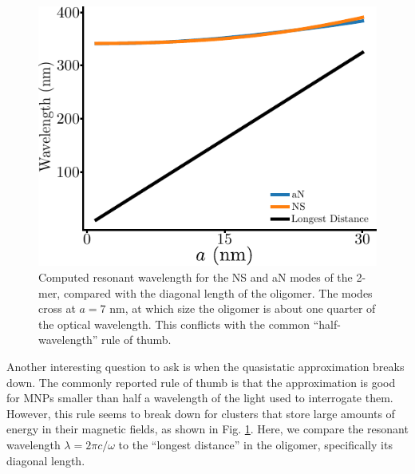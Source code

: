 \documentclass [11pt, proquest] {uwthesis}[2016/11/22]
\begin{document}
\begin{figure}
\begin{centering}
\includegraphics{length_comparison_scale.pdf}
\caption{Computed resonant wavelength for the NS and aN modes of the 2-mer, compared with the diagonal length of the oligomer. The modes cross at $a = 7$ nm, at which size the oligomer is about one quarter of the optical wavelength. This conflicts with the common ``half-wavelength'' rule of thumb.}
\label{scale_wavelength_comp}
\end{centering}
\end{figure}


Another interesting question to ask is when the quasistatic approximation breaks down. The commonly reported rule of thumb is that the approximation is good for MNPs smaller than half a wavelength of the light used to interrogate them. However, this rule seems to break down for clusters that store large amounts of energy in their magnetic fields, as shown in Fig. \ref{scale_wavelength_comp}. Here, we compare the resonant wavelength $\lambda = 2\pi c/\omega$ to the ``longest distance'' in the oligomer, specifically its diagonal length.
\end{document}

